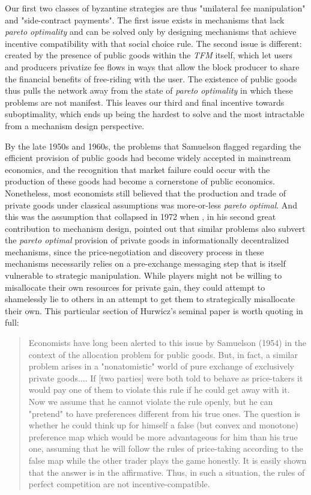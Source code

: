 \documentclass[sigconf,anonymous]{aamas}
\begin{document}
Our first two classes of byzantine strategies are thus "unilateral fee manipulation" and "side-contract payments". The first issue exists in mechanisms that lack \textit{pareto optimality} and can be solved only by designing mechanisms that achieve incentive compatibility with that social choice rule. The second issue is different: created by the presence of public goods within the \textit{TFM} itself, which let users and producers privatize fee flows in ways that allow the block producer to share the financial benefits of free-riding with the user. The existence of public goods thus pulls the network away from the state of \textit{pareto optimality} in which these problems are not manifest. This leaves our third and final incentive towards suboptimality, which ends up being the hardest to solve and the most intractable from a mechanism design perspective.

By the late 1950s and 1960s, the problems that Samuelson flagged regarding the efficient provision of public goods had become widely accepted in mainstream economics, and the recognition that market failure could occur with the production of these goods had become a cornerstone of public economics. Nonetheless, most economists still believed that the production and trade of private goods under classical assumptions was more-or-less \textit{pareto optimal}. And this was the assumption that collapsed in 1972 when \citet{hurwicz1973design}, in his second great contribution to mechanism design, pointed out that similar problems also subvert the \textit{pareto optimal} provision of private goods in informationally decentralized mechanisms, since the price-negotiation and discovery process in these mechanisms necessarily relies on a pre-exchange messaging step that is itself vulnerable to strategic manipulation. While players might not be willing to misallocate their own resources for private gain, they could attempt to shamelessly lie to others in an attempt to get them to strategically misallocate their own. This particular section of Hurwicz's seminal paper is worth quoting in full:

\begin{quote}
Economists have long been alerted to this issue by Samuelson (1954) in the context of the allocation problem for public goods. But, in fact, a similar problem arises in a "nonatomistic" world of pure exchange of exclusively private goods.... If [two parties] were both told to behave as price-takers it would pay one of them to violate this rule if he could get away with it. Now we assume that he cannot violate the rule openly, but he can "pretend" to have preferences different from his true ones. The question is whether he could think up for himself a false (but convex and monotone) preference map which would be more advantageous for him than his true one, assuming that he will follow the rules of price-taking according to the false map while the other trader plays the game honestly. It is easily shown that the answer is in the affirmative. Thus, in such a situation, the rules of perfect competition are not incentive-compatible.
\end{quote}
\end{document}
